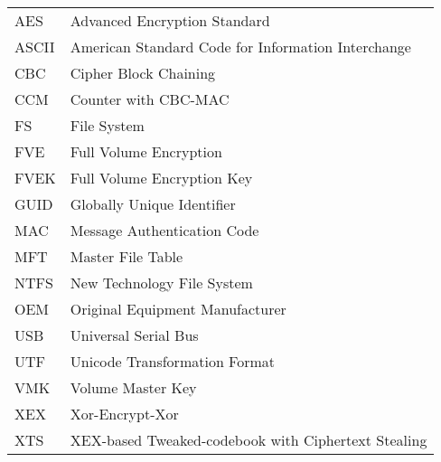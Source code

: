 
\seznamzkr

\begin{tabular}{ll}
  AES & Advanced Encryption Standard \\
  ASCII & American Standard Code for Information Interchange \\
  CBC & Cipher Block Chaining \\
  CCM & Counter with CBC-MAC \\
  FS &  File System \\
  FVE & Full Volume Encryption \\
  FVEK & Full Volume Encryption Key \\
  GUID & Globally Unique Identifier \\
  MAC & Message Authentication Code \\
  MFT & Master File Table \\
  NTFS & New Technology File System \\
  OEM & Original Equipment Manufacturer \\
  USB & Universal Serial Bus \\
  UTF & Unicode Transformation Format \\
  VMK & Volume Master Key \\
  XEX & Xor-Encrypt-Xor \\
  XTS & XEX-based Tweaked-codebook with Ciphertext Stealing \\
\end{tabular}

